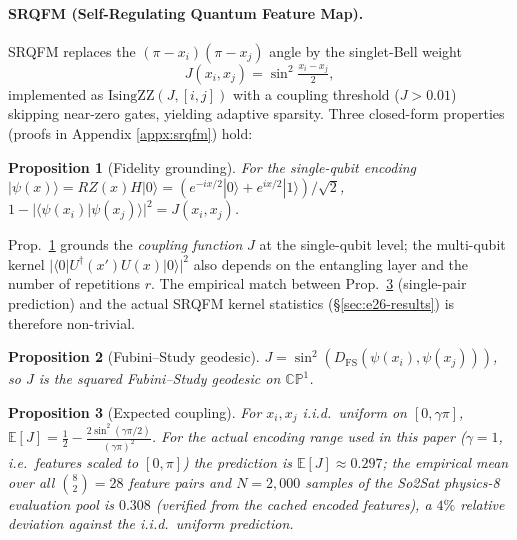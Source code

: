 \documentclass[pdflatex,sn-mathphys-num]{sn-jnl}
\theoremstyle{thmstyleone}
\newtheorem{proposition}{Proposition}
\theoremstyle{thmstyletwo}
\theoremstyle{thmstylethree}
\begin{document}
\paragraph{SRQFM (Self-Regulating Quantum Feature Map).}\label{sec:srqfm}
SRQFM replaces the $(\pi-x_i)(\pi-x_j)$ angle by the singlet-Bell weight
$$
J(x_i,x_j) = \sin^2\!\tfrac{x_i-x_j}{2},
$$
implemented as $\mathrm{IsingZZ}(J,[i,j])$ with a coupling threshold
($J>0.01$) skipping near-zero gates, yielding adaptive sparsity.
Three closed-form properties (proofs in Appendix \ref{appx:srqfm}) hold:

\begin{proposition}[Fidelity grounding]\label{prop:fid}
For the single-qubit encoding $|\psi(x)\rangle = RZ(x)H|0\rangle =
(e^{-ix/2}|0\rangle + e^{ix/2}|1\rangle)/\sqrt{2}$,
$1-|\langle\psi(x_i)|\psi(x_j)\rangle|^2=J(x_i,x_j)$.
\end{proposition}

\noindent Prop.~\ref{prop:fid} grounds the \emph{coupling function}
$J$ at the single-qubit level; the multi-qubit kernel
$|\langle 0|U^\dagger(x')U(x)|0\rangle|^2$ also depends on the
entangling layer and the number of repetitions $r$. The empirical
match between Prop.~\ref{prop:exp} (single-pair prediction) and the
actual SRQFM kernel statistics (\S\ref{sec:e26-results}) is therefore
non-trivial.

\begin{proposition}[Fubini--Study geodesic]\label{prop:fs}
$J=\sin^2(D_{\mathrm{FS}}(\psi(x_i),\psi(x_j)))$, so $J$ is the squared
Fubini--Study geodesic on $\mathbb{CP}^1$.
\end{proposition}

\begin{proposition}[Expected coupling]\label{prop:exp}
For $x_i,x_j$ i.i.d.\ uniform on $[0,\gamma\pi]$,
$\mathbb{E}[J] = \tfrac12 - \tfrac{2\sin^2(\gamma\pi/2)}{(\gamma\pi)^2}$.
For the actual encoding range used in this paper ($\gamma=1$, i.e.\
features scaled to $[0,\pi]$) the prediction is
$\mathbb{E}[J] \approx 0.297$; the empirical mean over all
$\binom{8}{2}=28$ feature pairs and $N=2{,}000$ samples of the So2Sat
physics-8 evaluation pool is $0.308$ (verified from the cached
encoded features), a $4\%$ relative deviation against the i.i.d.\
uniform prediction.
\end{proposition}
\end{document}
